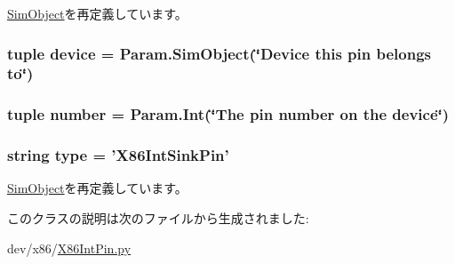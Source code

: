 \hyperlink{classm5_1_1SimObject_1_1SimObject_a17da7064bc5c518791f0c891eff05fda}{SimObject}を再定義しています。\hypertarget{classX86IntPin_1_1X86IntSinkPin_a1cd0f8935f73f0628450287bdefa57d2}{
\subsubsection[{device}]{\setlength{\rightskip}{0pt plus 5cm}tuple {\bf device} = Param.SimObject(\char`\"{}Device this pin belongs to\char`\"{})}}
\label{classX86IntPin_1_1X86IntSinkPin_a1cd0f8935f73f0628450287bdefa57d2}
\hypertarget{classX86IntPin_1_1X86IntSinkPin_a629b7ca94b6a486bdc504ed959b90cc8}{
\subsubsection[{number}]{\setlength{\rightskip}{0pt plus 5cm}tuple {\bf number} = Param.Int(\char`\"{}The pin {\bf number} on the {\bf device}\char`\"{})}}
\label{classX86IntPin_1_1X86IntSinkPin_a629b7ca94b6a486bdc504ed959b90cc8}
\hypertarget{classX86IntPin_1_1X86IntSinkPin_acce15679d830831b0bbe8ebc2a60b2ca}{
\subsubsection[{type}]{\setlength{\rightskip}{0pt plus 5cm}string {\bf type} = '{\bf X86IntSinkPin}'}}
\label{classX86IntPin_1_1X86IntSinkPin_acce15679d830831b0bbe8ebc2a60b2ca}


\hyperlink{classm5_1_1SimObject_1_1SimObject_acce15679d830831b0bbe8ebc2a60b2ca}{SimObject}を再定義しています。

このクラスの説明は次のファイルから生成されました:\begin{DoxyCompactItemize}
\item 
dev/x86/\hyperlink{X86IntPin_8py}{X86IntPin.py}\end{DoxyCompactItemize}
